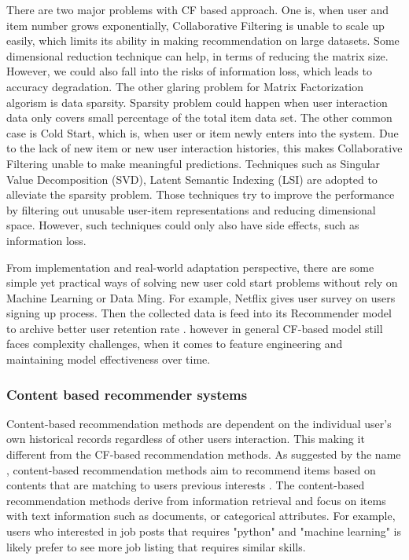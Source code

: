 There are two major problems with CF based approach.  
One is, when user and item number grows exponentially, Collaborative Filtering is unable to scale up easily, which limits its ability in making recommendation on large datasets. Some dimensional reduction technique can help, in terms of reducing the matrix size. However, we could also fall into the risks of information loss, which leads to accuracy degradation. 
The other glaring problem for Matrix Factorization algorism is data sparsity. Sparsity problem could happen when user interaction data only covers small percentage of the total item data set. The other common case is Cold Start, which is, when user or item newly enters into the system. Due to the lack of new item or new user interaction histories, this makes Collaborative Filtering unable to make meaningful predictions.  
Techniques such as Singular Value Decomposition (SVD), Latent Semantic Indexing (LSI) are adopted to alleviate the sparsity problem. Those techniques try to improve the performance by filtering out unusable user-item representations and reducing dimensional space. However, such techniques could only also have side effects, such as information loss. 

From implementation and real-world adaptation perspective, there are some simple yet practical ways of solving new user cold start problems without rely on Machine Learning or Data Ming. For example, Netflix gives user survey on users signing up process. Then the collected data is feed into its Recommender model to archive better user retention rate \citep{gomez2015netflix}. however in general CF-based model still faces complexity challenges, when it comes to feature engineering and maintaining model effectiveness over time. 


\bigskip
\subsubsection{Content based recommender systems}

Content-based recommendation methods are dependent on the individual user’s own historical records regardless of other users interaction. This making it different from the CF-based recommendation methods. 
As suggested by the name , content-based recommendation methods aim to recommend items based on contents that are matching to users previous interests \citep{shardanand1995social}. The content-based recommendation methods derive from information retrieval and focus on items with text information such as documents, or categorical attributes. For example, users who interested in job posts that requires "python" and "machine learning" is likely prefer to see more job listing that requires similar skills. 

